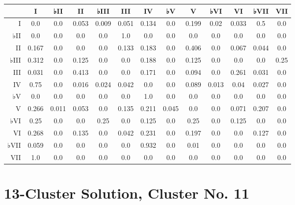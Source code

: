 \begin{table}[htbp]
\begin{minipage}{\linewidth}
\setlength{\tymax}{0.5\linewidth}
\centering
\small
\begin{tabulary}{\textwidth}{@{}RCCCCCCCCCCCC@{}} \toprule
&I&♭II&II&♭III&III&IV&♭V&V&♭VI&VI&♭VII&VII\\
\midrule
I&0.0&0.0&0.053&0.009&0.051&0.134&0.0&0.199&0.02&0.033&0.5&0.0\\
♭II&0.0&0.0&0.0&0.0&1.0&0.0&0.0&0.0&0.0&0.0&0.0&0.0\\
II&0.167&0.0&0.0&0.0&0.133&0.183&0.0&0.406&0.0&0.067&0.044&0.0\\
♭III&0.312&0.0&0.125&0.0&0.0&0.188&0.0&0.125&0.0&0.0&0.0&0.25\\
III&0.031&0.0&0.413&0.0&0.0&0.171&0.0&0.094&0.0&0.261&0.031&0.0\\
IV&0.75&0.0&0.016&0.024&0.042&0.0&0.0&0.089&0.013&0.04&0.027&0.0\\
♭V&0.0&0.0&0.0&0.0&0.0&1.0&0.0&0.0&0.0&0.0&0.0&0.0\\
V&0.266&0.011&0.053&0.0&0.135&0.211&0.045&0.0&0.0&0.071&0.207&0.0\\
♭VI&0.25&0.0&0.0&0.25&0.0&0.125&0.0&0.25&0.0&0.125&0.0&0.0\\
VI&0.268&0.0&0.135&0.0&0.042&0.231&0.0&0.197&0.0&0.0&0.127&0.0\\
♭VII&0.059&0.0&0.0&0.0&0.0&0.932&0.0&0.01&0.0&0.0&0.0&0.0\\
VII&1.0&0.0&0.0&0.0&0.0&0.0&0.0&0.0&0.0&0.0&0.0&0.0\\

\bottomrule

\end{tabulary}
\end{minipage}
\end{table}

\section{13-Cluster Solution, Cluster No. 11}
\label{13-clustersolutionclusterno.11}

